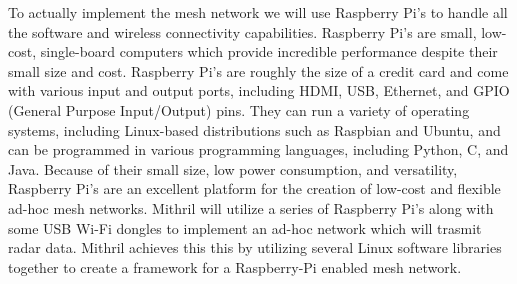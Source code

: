   To actually implement the mesh network we will use Raspberry Pi's to handle all the software and wireless connectivity capabilities. Raspberry Pi's are small, low-cost, single-board computers which provide incredible performance despite their small size and cost. Raspberry Pi's are roughly the size of a credit card and come with various input and output ports, including HDMI, USB, Ethernet, and GPIO (General Purpose Input/Output) pins. They can run a variety of operating systems, including Linux-based distributions such as Raspbian and Ubuntu, and can be programmed in various programming languages, including Python, C, and Java. Because of their small size, low power consumption, and versatility, Raspberry Pi's are an excellent platform for the creation of low-cost and flexible ad-hoc mesh networks. Mithril will utilize a series of Raspberry Pi's along with some USB Wi-Fi dongles to implement an ad-hoc network which will trasmit radar data. Mithril achieves this this by utilizing several Linux software libraries together to create a framework for a Raspberry-Pi enabled mesh network.


